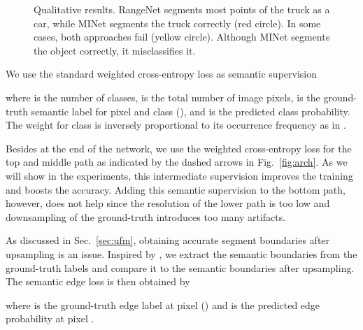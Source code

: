 \documentclass[letterpaper, 10 pt, journal, twoside]{ieeetran}
\newcommand{\figref}[1]{Fig.~\ref{#1}}
\newcommand{\secref}[1]{Sec.~\ref{#1}}
\begin{document}
\begin{figure*}[!t]
    \centering
     \hspace{1mm}
     \hspace{1mm}
     \hspace{1mm}
     \hspace{1mm}
    \caption{Qualitative results.
    RangeNet segments most points of the truck as a car, 
    while MINet segments the truck correctly (red circle). 
    In some cases, both approaches fail (yellow circle). 
    Although MINet segments the object correctly, it misclassifies it.}
    \label{fig:vis_3d}
    \vspace{-6mm}
\end{figure*}

We use the standard weighted cross-entropy loss as semantic supervision

where  is the number of classes,  is the total number of image pixels,  is the ground-truth semantic label for pixel  and class  (), and  is the predicted class probability. The weight  for class  is inversely proportional to its occurrence frequency as in \cite{milioto2019rangenet++}.

Besides at the end of the network, we use the weighted cross-entropy loss  for the top and middle path as indicated by the dashed arrows in \figref{fig:arch}. As we will show in the experiments, this intermediate supervision improves the training and boosts the accuracy. Adding this semantic supervision to the bottom path, however, does not help since the resolution of the lower path is too low and downsampling of the ground-truth introduces too many artifacts.      


As discussed in \secref{sec:ufm}, obtaining accurate segment boundaries after upsampling is an issue. 
Inspired by \cite{yu2018learning,kirillov2017instancecut}, we extract the semantic boundaries from the ground-truth labels and compare it to the semantic boundaries after upsampling. The semantic edge loss is then obtained by

where  is the ground-truth edge label at pixel  ()
and  is the predicted edge probability at pixel .
\end{document}
